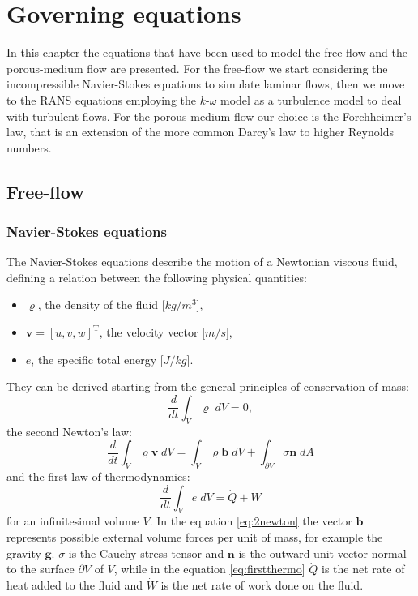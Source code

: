 \chapter{Governing equations} \label{chap:equations} %
In this chapter the equations that have been used to model the 
free-flow and the porous-medium flow are presented. For the free-flow we start 
considering the incompressible Navier-Stokes equations to simulate laminar 
flows, then we move to the RANS equations employing the $k\text{-}\omega$ 
model as a turbulence model to deal with turbulent flows. For the porous-medium 
flow our choice is the Forchheimer's law, that is an extension of the more 
common Darcy's law to higher Reynolds numbers.
\section{Free-flow}
\subsection{Navier-Stokes equations}
The Navier-Stokes equations describe the motion of a Newtonian viscous fluid,
defining a relation between the following physical quantities:
\begin{itemize}
	\item $\varrho$, the density of the fluid  [$\si{kg/m^3}$],
	\item $\mathbf{v} = [u, v, w]^\mathrm{T}$, the velocity vector [$\si{m/s}$],
	\item $e$, the specific total energy [$\si{J/kg}$].
\end{itemize}
They can be derived starting from the general principles of conservation of 
mass:
\begin{equation} \label{eq:masscons}
\frac{d}{dt} \int_V \varrho \; dV = 0,
\end{equation}
the second Newton's law:
\begin{equation} \label{eq:2newton}
\frac{d}{dt} \int_V \varrho \mathbf{v} \; dV = \int_V \varrho \mathbf{b} \; dV 
+ 
\int_{\partial V} \sigma \mathbf{n} \; dA
\end{equation}
and the first law of thermodynamics:
\begin{equation} \label{eq:firstthermo}
\frac{d}{dt} \int_V e \; dV = \dot{Q} + \dot{W}
\end{equation}
for an infinitesimal volume $V$. In the equation \eqref{eq:2newton} the vector 
$\mathbf{b}$ represents possible external volume forces per unit of mass, for 
example the gravity $\mathbf{g}$. $\sigma$ is the Cauchy stress tensor 
and 
$\mathbf{n}$ is the outward unit vector normal to the surface $\partial V$ of 
$V$, while in the equation \eqref{eq:firstthermo} $\dot{Q}$ is the net rate of 
heat added to the fluid and $\dot{W}$ is the net rate of work done on the fluid.


